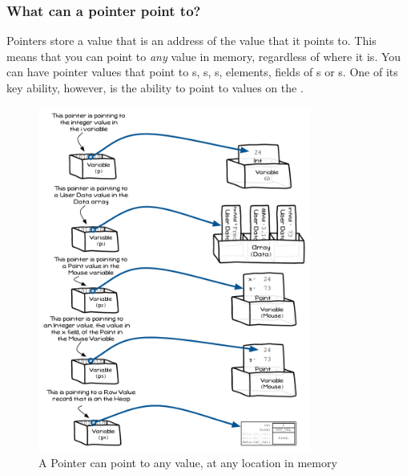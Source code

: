 
\clearpage
\subsubsection{What can a pointer point to?} %
\label{ssub:what_can_a_pointer_point_to_}

Pointers store a value that is an address of the value that it points to. This means that you can point to \emph{any} value in memory, regardless of where it is. You can have pointer values that point  to s, s, s,  elements, fields of s or s. One of its key ability, however, is the ability to point to values on the .

\begin{figure}[h]
   \centering
   \includegraphics[width=0.8\textwidth]{./topics/dynamic-memory/diagrams/PointerPointing} 
   \caption{A Pointer can point to any value, at any location in memory}
   \label{fig:pointer-pointing}
\end{figure}


